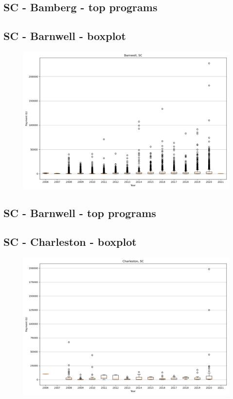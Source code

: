 \subsection*{SC - Bamberg - top programs}

\newpage
\subsection*{SC - Barnwell - boxplot}
\begin{figure}[h]
\centering
\includegraphics[width=7in]{../output/boxplots/counties/Barnwell-SC_boxplot.png}
\end{figure}


\subsection*{SC - Barnwell - top programs}

\newpage
\subsection*{SC - Charleston - boxplot}
\begin{figure}[h]
\centering
\includegraphics[width=7in]{../output/boxplots/counties/Charleston-SC_boxplot.png}
\end{figure}


